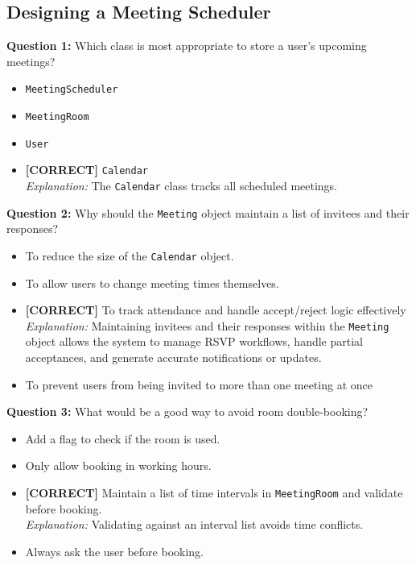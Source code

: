 \subsection*{Designing a Meeting Scheduler}
\vspace{0.3cm}
\noindent
\textbf{Question 1:} Which class is most appropriate to store a user's upcoming meetings?
\\[0.2cm]
\begin{itemize}
 \item \texttt{MeetingScheduler}
 \item \texttt{MeetingRoom}
 \item \texttt{User}
 \item \textbf{[CORRECT]} \texttt{Calendar}
\\[0.1cm]
\textit{Explanation:} 
The \texttt{Calendar} class tracks all scheduled meetings.
\end{itemize}
\vspace{0.3cm}
\noindent
\textbf{Question 2:} Why should the \texttt{Meeting} object maintain a list of invitees and their responses?
\\[0.2cm]
\begin{itemize}
 \item To reduce the size of the \texttt{Calendar} object.
 \item To allow users to change meeting times themselves.
 \item \textbf{[CORRECT]} To track attendance and handle accept/reject logic effectively
\\[0.1cm]
\textit{Explanation:} 
Maintaining invitees and their responses within the \texttt{Meeting} object allows the system to manage RSVP workflows, handle partial acceptances, and generate accurate notifications or updates.
 \item To prevent users from being invited to more than one meeting at once
\end{itemize}
\vspace{0.3cm}
\noindent
\textbf{Question 3:} What would be a good way to avoid room double-booking?
\\[0.2cm]
\begin{itemize}
 \item Add a flag to check if the room is used.
 \item Only allow booking in working hours.
 \item \textbf{[CORRECT]} Maintain a list of time intervals in \texttt{MeetingRoom} and validate before booking.
\\[0.1cm]
\textit{Explanation:} 
Validating against an interval list avoids time conflicts.
 \item Always ask the user before booking.
\end{itemize}
